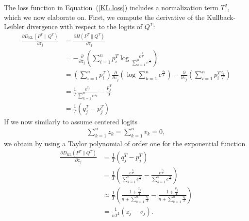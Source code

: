\begin{rem}
    The loss function in Equation~(\ref{KL loss}) includes a normalization term $T^2$, which we now elaborate on. First, we compute the derivative of the Kullback-Leibler divergence with respect to the logits of $Q^T:$
    \begin{equation}
	\begin{aligned}
		\frac{\partial D_\text{KL}(P^T \| Q^T)}{\partial z_j} &= \frac{\partial H(P^T \| Q^T)}{\partial z_j}\\
        &= - \frac{\partial}{\partial z_j}\left(\sum_{i=1}^{n} p^T_i \log \frac{e^{\frac{z_i}{T}}}{\sum_{k=1}^n e^{\frac{z_k}{T}}}\right)\\
		&= \left( \sum_{i=1}^{n} p^T_i \right)\frac{\partial}{\partial z_j}\left(\log \sum_{k=1}^n e^{\frac{z_k}{T}}\right) - \frac{\partial}{\partial z_j}\left(\sum_{i=1}^{n} p^T_i \frac{z_i}{T}\right) \\
		&= \frac{1}{T} \frac{e^{z_j}}{\sum_{k=1}^n e^{z_k}} - \frac{p^T_j}{T} \\
		&= \frac{1}{T} (q^T_j - p^T_j)
	\end{aligned}
    \label{KL gradient}
\end{equation}
If we now similarly to \cite{HintonVinyalsDean2015} assume centered logits
\begin{align}
\sum_{k=1}^{n} z_k = \sum_{k=1}^{n} v_k = 0,
    \label{centered logits}
\end{align}
we obtain by using a Taylor polynomial of order one for the exponential function
\begin{equation}
\begin{aligned}
    \frac{\partial D_\text{KL}(P^T \| Q^T)}{\partial z_j} &= \frac{1}{T} (q^T_j - p^T_j)\\
        &=\frac{1}{T} \left( \frac{e^{\frac{z_j}{T}}}{\sum_{k=1}^{n} e^{\frac{z_k}{T}}} - \frac{e^{\frac{v_j}{T}}}{\sum_{k=1}^{n} e^{\frac{v_k}{T}}} \right)\\
        &\approx \frac{1}{T} \left( \frac{1+{\frac{z_j}{T}}}{n + \sum_{k=1}^{n} {\frac{z_k}{T}}} - \frac{1+{\frac{v_j}{T}}}{n + \sum_{k=1}^{n} {\frac{v_k}{T}}} \right)\\
        &=\frac{1}{n T^2} (z_j-v_j).
\end{aligned}
	\label{additional term 1}
\end{equation}

\end{rem}
